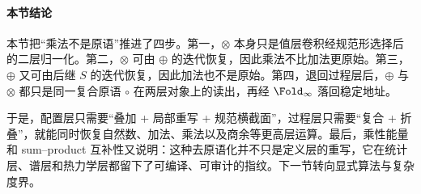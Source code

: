 \paragraph{本节结论}
本节把“乘法不是原语”推进了四步。第一，\(\otimes\) 本身只是值层卷积经规范形选择后的二层归一化。第二，\(\otimes\) 可由 \(\oplus\) 的迭代恢复，因此乘法不比加法更原始。第三，\(\oplus\) 又可由后继 \(S\) 的迭代恢复，因此加法也不是原始。第四，退回过程层后，\(\oplus\) 与 \(\otimes\) 都只是同一复合原语 \(\circ\) 在两层对象上的读出，再经 \(\Fold_\infty\) 落回稳定地址。

于是，配置层只需要“叠加 + 局部重写 + 规范横截面”，过程层只需要“复合 + 折叠”，就能同时恢复自然数、加法、乘法以及商余等更高层运算。最后，乘性能量和 sum--product 互补性又说明：这种去原语化并不只是定义层的重写，它在统计层、谱层和热力学层都留下了可编译、可审计的指纹。下一节转向显式算法与复杂度界。
